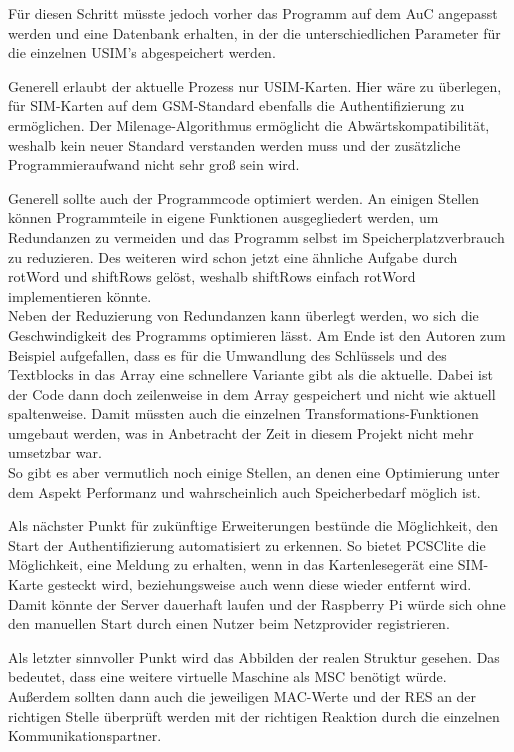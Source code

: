 		Für diesen Schritt müsste jedoch vorher das Programm auf dem AuC angepasst
		werden und eine Datenbank erhalten, in der die unterschiedlichen Parameter für
		die einzelnen USIM's abgespeichert werden.

		Generell erlaubt der aktuelle Prozess nur USIM-Karten. Hier wäre zu überlegen,
		für SIM-Karten auf dem GSM-Standard ebenfalls die
		Authentifizierung zu ermöglichen. Der Milenage-Algorithmus ermöglicht die
		Abwärtskompatibilität, weshalb kein neuer Standard verstanden werden muss und
		der zusätzliche Programmieraufwand nicht sehr groß sein wird.
	
		Generell sollte auch der Programmcode optimiert werden. An einigen Stellen
		können Programmteile in eigene Funktionen ausgegliedert werden, um Redundanzen
		zu vermeiden und das Programm selbst im Speicherplatzverbrauch zu reduzieren. Des
		weiteren wird schon jetzt eine ähnliche Aufgabe durch rotWord und shiftRows
		gelöst, weshalb shiftRows einfach rotWord implementieren könnte. \\
		Neben der Reduzierung von Redundanzen kann überlegt werden, wo sich die
		Geschwindigkeit des Programms optimieren lässt. Am Ende ist den Autoren zum
		Beispiel aufgefallen, dass es für die Umwandlung des Schlüssels und des
		Textblocks in das Array eine schnellere Variante gibt als die aktuelle. Dabei
		ist der Code dann doch zeilenweise in dem Array gespeichert und nicht wie aktuell
		spaltenweise. Damit müssten auch die einzelnen Transformations-Funktionen
		umgebaut werden, was in Anbetracht der Zeit in diesem Projekt nicht mehr umsetzbar
		war. \\
		So gibt es aber vermutlich noch einige Stellen, an denen eine Optimierung unter dem
		Aspekt Performanz und wahrscheinlich auch Speicherbedarf möglich ist.
	
		Als nächster Punkt für zukünftige Erweiterungen bestünde die Möglichkeit, den
		Start der Authentifizierung automatisiert zu erkennen. So bietet PCSClite die
		Möglichkeit, eine Meldung zu erhalten, wenn in das Kartenlesegerät eine SIM-Karte
		gesteckt wird, beziehungsweise auch wenn diese wieder entfernt wird. Damit
		könnte der Server dauerhaft laufen und der Raspberry Pi würde sich ohne den
		manuellen Start durch einen Nutzer beim Netzprovider registrieren.

		Als letzter sinnvoller Punkt wird das Abbilden der realen Struktur gesehen. Das
		bedeutet, dass eine weitere virtuelle Maschine als MSC benötigt würde. Außerdem
		sollten dann auch die jeweiligen MAC-Werte und der RES an der richtigen Stelle
		überprüft werden mit der richtigen Reaktion durch die einzelnen Kommunikationspartner.